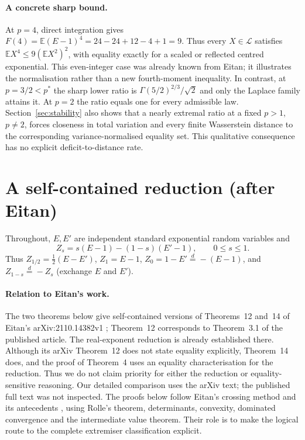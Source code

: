 \documentclass[11pt]{article}
\theoremstyle{remark}
\newcommand{\E}{\mathbb E}
\newcommand{\eqd}{\overset{d}{=}}
\begin{document}
\paragraph{A concrete sharp bound.} At $p=4$, direct integration gives
$F(4)=\E(E-1)^4=24-24+12-4+1=9$. Thus every
$X\in\mathcal L$ satisfies $\E X^4\le9(\E X^2)^2$, with equality
exactly for a scaled or reflected centred exponential. This even-integer
case was already known from Eitan; it illustrates the normalisation rather
than a new fourth-moment inequality. In contrast, at $p=3/2<p^*$ the
sharp lower ratio is $\Gamma(5/2)^{2/3}/\sqrt2$ and only the Laplace
family attains it. At $p=2$ the ratio equals one for every admissible law.
Section~\ref{sec:stability} also shows that a nearly extremal ratio at a
fixed $p>1$, $p\ne2$, forces closeness in total variation and every finite
Wasserstein distance to the corresponding variance-normalised equality set.
This qualitative consequence has no explicit deficit-to-distance rate.

\section{A self-contained reduction (after Eitan)}\label{sec:selfred}
Throughout, $E,E'$ are independent standard exponential random variables and
\[
Z_s=s(E-1)-(1-s)(E'-1),\qquad 0\le s\le1.
\]
Thus $Z_{1/2}=\frac12(E-E')$, $Z_1=E-1$, $Z_0=1-E'\eqd-(E-1)$, and $Z_{1-s}\eqd-Z_s$ (exchange $E$ and $E'$).

\paragraph{Relation to Eitan's work.} The two theorems below give self-contained versions of Theorems~12 and~14 of Eitan's arXiv:2110.14382v1 \cite{Eitan}; Theorem~12 corresponds to Theorem~3.1 of the published article. The real-exponent reduction is already established there. Although its arXiv Theorem~12 does not state equality explicitly, Theorem~14 does, and the proof of Theorem~4 uses an equality characterisation for the reduction. Thus we do not claim priority for either the reduction or equality-sensitive reasoning. Our detailed comparison uses the arXiv text; the published full text was not inspected. The proofs below follow Eitan's crossing method and its antecedents \cite{ENT}, using Rolle's theorem, determinants, convexity, dominated convergence and the intermediate value theorem. Their role is to make the logical route to the complete extremiser classification explicit.
\end{document}
